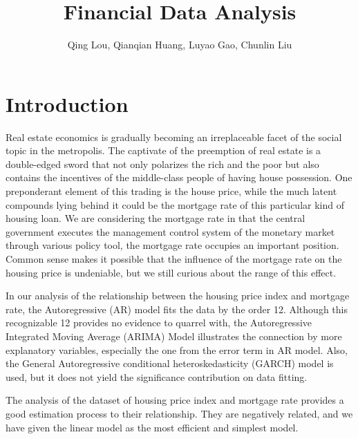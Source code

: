 \documentclass[12pt,letterpaper]{article}
\begin{document}
\title{\textbf{\Large Financial Data Analysis}}
\author{Qing Lou, Qianqian Huang, Luyao Gao, Chunlin Liu}
\date{}
\maketiitle 

\thispagestyle{empty}
\tableofcontents

\newpage
\clearpage





\section{Introduction}

Real estate economics is gradually becoming an irreplaceable facet of the social topic in the metropolis. 
The captivate of the preemption of real estate is a double-edged sword that not only polarizes the rich and the poor but also contains the incentives of the middle-class people of having house possession.
One preponderant element of this trading is the house price, while the much latent compounds lying behind it could be the mortgage rate of this particular kind of housing loan.
We are considering the mortgage rate in that the central government executes the management control system of the monetary market through various policy tool, the mortgage rate occupies an important position.
Common sense makes it possible that the influence of the mortgage rate on the housing price is undeniable, but we still curious about the range of this effect.

In our analysis of the relationship between the housing price index and mortgage rate, the Autoregressive (AR) model fits the data by the order 12. 
Although this recognizable 12 provides no evidence to quarrel with, the Autoregressive Integrated Moving Average (ARIMA) Model illustrates the connection by more explanatory variables, especially the one from the error term in AR model.
Also, the General Autoregressive conditional heteroskedasticity (GARCH) model is used, but it does not yield the significance contribution on data fitting.

The analysis of the dataset of housing price index and mortgage rate provides a good estimation process to their relationship. 
They are negatively related, and we have given the linear model as the most efficient and simplest model.
\end{document}
